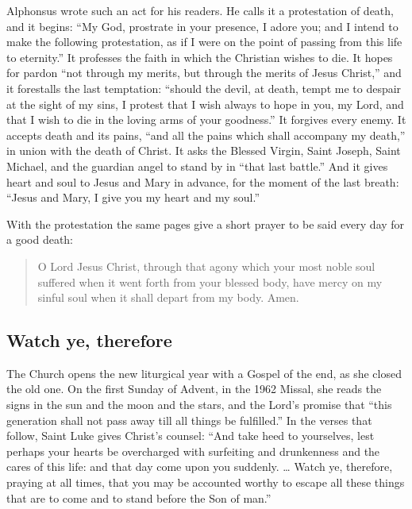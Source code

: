 Alphonsus wrote such an act for his readers. He calls it a protestation of death, and it begins: ``My God, prostrate in your presence, I adore you; and I intend to make the following protestation, as if I were on the point of passing from this life to eternity.'' It professes the faith in which the Christian wishes to die. It hopes for pardon ``not through my merits, but through the merits of Jesus Christ,'' and it forestalls the last temptation: ``should the devil, at death, tempt me to despair at the sight of my sins, I protest that I wish always to hope in you, my Lord, and that I wish to die in the loving arms of your goodness.'' It forgives every enemy. It accepts death and its pains, ``and all the pains which shall accompany my death,'' in union with the death of Christ. It asks the Blessed Virgin, Saint Joseph, Saint Michael, and the guardian angel to stand by in ``that last battle.'' And it gives heart and soul to Jesus and Mary in advance, for the moment of the last breath: ``Jesus and Mary, I give you my heart and my soul.''

With the protestation the same pages give a short prayer to be said every day for a good death:

\begin{quote}
O Lord Jesus Christ, through that agony which your most noble soul suffered when it went forth from your blessed body, have mercy on my sinful soul when it shall depart from my body. Amen.
\end{quote}

\subsection{Watch ye, therefore}

The Church opens the new liturgical year with a Gospel of the end, as she closed the old one. On the first Sunday of Advent, in the 1962 Missal, she reads the signs in the sun and the moon and the stars, and the Lord's promise that ``this generation shall not pass away till all things be fulfilled.'' In the verses that follow, Saint Luke gives Christ's counsel: ``And take heed to yourselves, lest perhaps your hearts be overcharged with surfeiting and drunkenness and the cares of this life: and that day come upon you suddenly. \ldots{} Watch ye, therefore, praying at all times, that you may be accounted worthy to escape all these things that are to come and to stand before the Son of man.''

